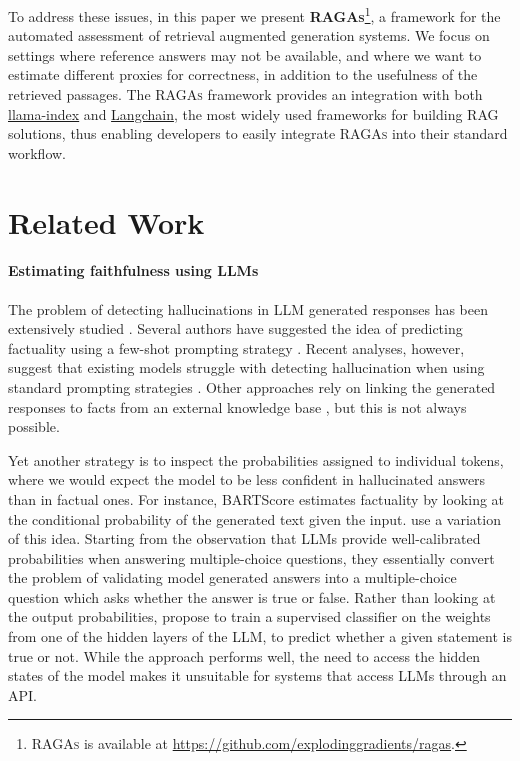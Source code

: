 \documentclass[11pt]{article}
\begin{document}
To address these issues, in this paper we present \textsc{\textbf{RAGAs}}\footnote{\textsc{RAGAs} is available at \url{https://github.com/explodinggradients/ragas}.}, a framework for the automated assessment of retrieval augmented generation systems. We focus on settings where reference answers may not be available, and where we want to estimate different proxies for correctness, in addition to the usefulness of the retrieved passages. The \textsc{RAGAs} framework provides an integration with both \href{https://github.com/jerryjliu/llama_index}{llama-index} and \href{https://github.com/langchain-ai/langchain}{Langchain}, the most widely used frameworks for building RAG solutions, thus enabling developers to easily integrate \textsc{RAGAs} into their standard workflow.


\section{Related Work}

\paragraph{Estimating faithfulness using LLMs}
The problem of detecting hallucinations in LLM generated responses has been extensively studied \cite{ji2023survey}. Several authors have suggested the idea of predicting factuality using a few-shot prompting strategy \cite{DBLP:journals/corr/abs-2304-03728}. Recent analyses, however, suggest that existing models struggle with detecting hallucination when using standard prompting strategies \cite{DBLP:journals/corr/abs-2305-11747,DBLP:journals/corr/abs-2304-13734}. Other approaches rely on linking the generated responses to facts from an external knowledge base \cite{DBLP:journals/corr/abs-2305-14251}, but this is not always possible.

Yet another strategy is to inspect the probabilities assigned to individual tokens, where we would expect the model to be less confident in hallucinated answers than in factual ones. For instance, BARTScore \cite{DBLP:conf/nips/YuanNL21} estimates factuality by looking at the conditional probability of the generated text given the input. \citet{DBLP:journals/corr/abs-2207-05221} use a variation of this idea. Starting from the observation that LLMs provide well-calibrated probabilities when answering multiple-choice questions, they essentially convert the problem of validating model generated answers into a multiple-choice question which asks whether the answer is true or false. Rather than looking at the output probabilities, \citet{DBLP:journals/corr/abs-2304-13734} propose to train a supervised classifier on the weights from one of the hidden layers of the LLM, to predict whether a given statement is true or not. While the approach performs well, the need to access the hidden states of the model makes it unsuitable for systems that access LLMs through an API.
\end{document}
